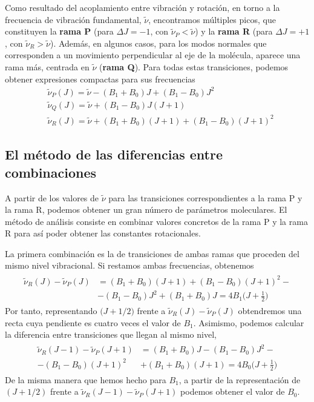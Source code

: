 \documentclass{tufte-handout}
\begin{document}
Como resultado del acoplamiento entre vibración y rotación, en torno a
la frecuencia de vibración fundamental, $\tilde{\nu}$, encontramos 
múltiples picos, que constituyen la \textbf{rama P} (para $\Delta J=-1$, 
con $\tilde{\nu}_P<\tilde{\nu}$) y la \textbf{rama R} (para 
$\Delta J=+1$, con $\tilde{\nu}_R>\tilde{\nu}$). Además, en 
algunos casos, para los modos normales que corresponden a un 
movimiento perpendicular al eje de la molécula, aparece una rama 
más, centrada en $\tilde{\nu}$ (\textbf{rama Q}). Para todas estas
transiciones, podemos obtener expresiones compactas para sus 
frecuencias
\begin{align}
    &\tilde{\nu}_P(J)=\tilde{\nu} - (B_1+B_0)J + (B_1-B_0)J^2 \label{eq:nuP}\\
    &\tilde{\nu}_Q(J)=\tilde{\nu} + (B_1-B_0)J(J+1) \label{eq:nuQ}\\
    &\tilde{\nu}_R
    (J)=\tilde{\nu} + (B_1+B_0)(J+1) + (B_1-B_0)(J+1)^2 \label{eq:nuR}
\end{align}

\subsection{El método de las diferencias entre combinaciones}
A partir de los valores de $\tilde{\nu}$ para las transiciones
correspondientes a la rama P y la rama R, podemos obtener un 
gran número de parámetros moleculares. El método de análisis
consiste en combinar valores concretos de la rama P y la
rama R para así poder obtener las constantes rotacionales.

La primera combinación es la de transiciones de ambas ramas
que proceden del mismo nivel vibracional. Si restamos ambas
frecuencias, obtenemos
\begin{align}
\begin{split}
    \tilde{\nu}_R(J) - \tilde{\nu}_P(J)&=
    (B_1+B_0)(J+1) + (B_1-B_0)(J+1)^2 - \\
    &- (B_1-B_0)J^2 + (B_1 + B_0)J =4B_1\big(J+\frac{1}{2}\big)
\end{split}
\end{align}
Por tanto, representando $\big(J+1/2\big)$ frente a
$\tilde{\nu}_R(J) - \tilde{\nu}_P(J)$ obtendremos una
recta cuya pendiente es cuatro veces el valor de $B_1$.
Asimismo, podemos calcular la diferencia entre transiciones
que llegan al mismo nivel,
\begin{align}
    \begin{split}
    \tilde{\nu}_R(J-1) - \tilde{\nu}_P(J+1)&=
    (B_1+B_0)J - (B_1-B_0)J^2 - \\
    - (B_1-B_0)(J+1)^2 &+ (B_1 + B_0)(J+1) =4B_0\big(J+\frac{1}{2}\big)
    \end{split}
\end{align}
De la misma manera que hemos hecho para $B_1$,  a partir
de la representación de $(J+1/2)$ frente a $\tilde{\nu}_R(J-1) -
\tilde{\nu}_P(J+1)$ podemos obtener el valor de $B_0$.
\end{document}
